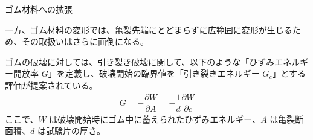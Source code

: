 \documentclass[11pt,a4paper]{jsarticle}
\makeatletter
\def\subsection{\@startsection 
{subsection}
{1}
{\z@}
{3.5ex plus -1ex minus -.2ex}
{1.ex plus .2ex}
{\large\bf}
}
\makeatother
\begin{document}
\subsection{ゴム材料への拡張}

一方、ゴム材料の変形では、亀裂先端にとどまらずに広範囲に変形が生じるため、その取扱いはさらに面倒になる。

ゴムの破壊に対しては、引き裂き破壊に関して、以下のような「ひずみエネルギー開放率 $G$」を定義し、破壊開始の臨界値を「引き裂きエネルギー $G_c$」とする評価が提案されている。
\begin{align}
G=-\dfrac{\partial W}{\partial A}=-\dfrac{1}{d}\dfrac{\partial W}{\partial c}
\end{align}
ここで、$W$ は破壊開始時にゴム中に蓄えられたひずみエネルギー、$A$ は亀裂断面積、$d$ は試験片の厚さ。


\color{black}


\newpage
\end{document}
